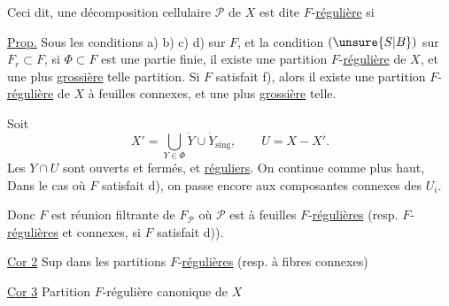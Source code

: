 Ceci dit, une décomposition cellulaire $\mathcal P$ de $X$ est dite $F$-\uline{régulière} si 

\uline{Prop.} Sous les conditions a) b) c) d)   sur $F$, et la condition $(\unsure{S|B})$ sur $F_r\subset F$, si $\Phi\subset F$ est une partie finie, il existe une partition $F$-\uline{régulière} de $X$, et \unsure{$=$|---} une plus \uline{grossière} telle partition. Si $F$ satisfait \unsure{$=$|---} f), alors il existe une partition $F$-\uline{régulière} de $X$ à feuilles connexes, et une plus \uline{grossière} telle.

Soit
\[
X'=\bigcup_{Y\in\Phi}\dot Y\cup\mathring Y_{\mathrm{sing}},\qquad U=X-X'.
\]
Les $Y\cap U$ sont ouverts et fermés, et \uline{réguliers}. On continue comme plus haut,  Dans le cas où $F$ satisfait d), on passe encore  aux composantes connexes des $U_i$.

 Donc $F$ est réunion filtrante de $F_{\mathcal P}$ où $\mathcal P$ est à feuilles $F$-\uline{régulières} (resp. $F$-\uline{régulières} et connexes, si $F$ satisfait d)).

\uline{Cor 2} Sup  dans les partitions $F$-\uline{régulières} (resp. à fibres connexes)

\uline{Cor 3} Partition $F$-régulière canonique de $X$
